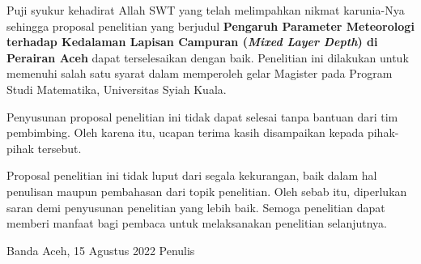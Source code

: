 \begin{spacing}{1.5}
	\pagestyle{empty}
	
	\vskip 1cm
	\par Puji syukur kehadirat Allah SWT yang telah melimpahkan nikmat karunia-Nya sehingga proposal penelitian yang berjudul \textbf{Pengaruh Parameter Meteorologi terhadap Kedalaman Lapisan Campuran (\textit{Mixed Layer Depth}) di Perairan Aceh} dapat terselesaikan dengan baik. Penelitian ini dilakukan untuk memenuhi salah satu syarat dalam memperoleh gelar Magister pada Program Studi Matematika, Universitas Syiah Kuala.
	\par Penyusunan proposal penelitian ini tidak dapat selesai tanpa bantuan dari tim pembimbing. Oleh karena itu, ucapan terima  kasih disampaikan kepada pihak-pihak tersebut.
	\par Proposal penelitian ini tidak luput dari segala kekurangan, baik dalam hal penulisan maupun pembahasan dari topik penelitian. Oleh sebab itu, diperlukan saran demi penyusunan penelitian yang lebih baik. Semoga penelitian dapat memberi manfaat bagi pembaca untuk melaksanakan penelitian selanjutnya.
	\vskip 1cm  
	\begin{flushright}
		Banda Aceh, 15 Agustus 2022
		\vskip 2cm
		Penulis	
	\end{flushright}
\end{spacing}
\pagestyle{empty}